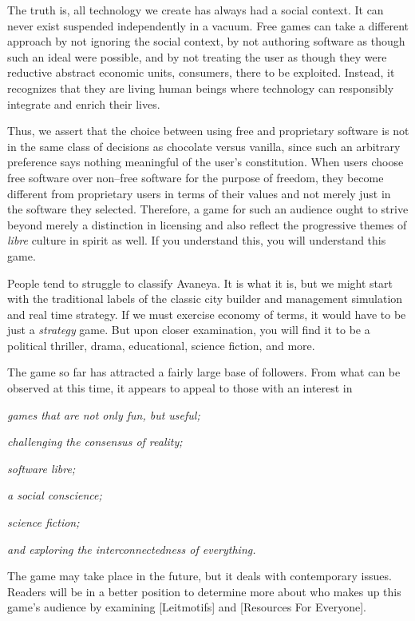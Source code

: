 The truth is, all technology we create has always had a social context. It can never exist suspended independently in a vacuum. Free games can take a different approach by not ignoring the social context, by not authoring software as though such an ideal were possible, and by not treating the user as though they were reductive abstract economic units, consumers, there to be exploited. Instead, it recognizes that they are living human beings where technology can responsibly integrate and enrich their lives. 

Thus, we assert that the choice between using free and proprietary software is not in the same class of decisions as chocolate versus vanilla, since such an arbitrary preference says nothing meaningful of the user's constitution. When users choose free software over non--free software for the purpose of freedom, they become different from proprietary users in terms of their values and not merely just in the software they selected. Therefore, a game for such an audience ought to strive beyond merely a distinction in licensing and also reflect the progressive themes of {\it libre} culture in spirit as well. If you understand this, you will understand this game.

People tend to struggle to classify Avaneya. It is what it is, but we might start with the traditional labels of the classic city builder and management simulation and real time strategy. If we must exercise economy of terms, it would have to be just a {\it strategy} game. But upon closer examination, you will find it to be a political thriller, drama, educational, science fiction, and more.

The game so far has attracted a fairly large base of followers. From what can be observed at this time, it appears to appeal to those with an interest in

\startitemize[4]
\item
{\it games that are not only fun, but useful;}
\item
{\it challenging the consensus of reality;}
\item
{\it software libre;}
\item
{\it a social conscience;}
\item
{\it science fiction;}
\item
{\it and exploring the interconnectedness of everything.}
\stopitemize

The game may take place in the future, but it deals with contemporary issues. Readers will be in a better position to determine more about who makes up this game's audience by examining [Leitmotifs] and [Resources For Everyone].

